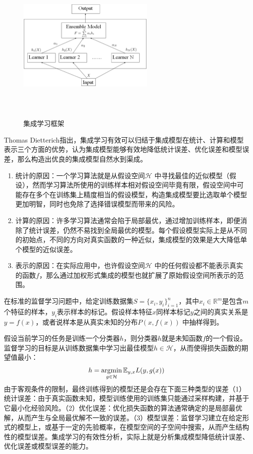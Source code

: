 \begin{figure}[htbp]
  \centering
  \includegraphics[width=0.6\textwidth,height=7cm]{figures/ensemblelearning.eps}\\
  \caption{集成学习框架}\label{fig:ensemblelearning}
\end{figure}

Thomas Dietterich\cite{dietterich2000ensemble}指出，集成学习有效可以归结于集成模型在统计、计算和模型表示三个方面的优势，认为集成模型能够有效地降低统计误差、优化误差和模型误差，那么构造出优良的集成模型自然水到渠成。

\begin{enumerate}[（1）]
  \item 统计的原因：一个学习算法就是从假设空间$\mathcal{H}$ 中寻找最佳的近似模型（假设），然而学习算法所使用的训练样本相对假设空间毕竟有限，假设空间中可能存在多个在训练集上精度相当的假设模型，构造集成模型要比选取单个模型更加明智，同时也免除了选择错误模型而带来的风险。
  \item 计算的原因：许多学习算法通常会陷于局部最优，通过增加训练样本，即便消除了统计误差，仍然不易找到全局最优的模型。每个假设模型实际上是从不同的初始点，不同的方向对真实函数的一种近似，集成模型的效果是大大降低单个模型的近似误差。
  \item 表示的原因：在实际应用中，也许假设空间$\mathcal{H}$ 中的任何假设都不能表示真实的函数$f$，那么通过加权形式集成的模型也就扩展了原始假设空间所表示的范围。
\end{enumerate}

在标准的监督学习问题中，给定训练数据集$S = \{x_i,y_i\}_{i=1}^n$，其中$x_i\in \mathbb{R}^m$是包含$m$个特征的样本，$y_i$表示样本的标记。假设样本特征$x$同样本标记$y$之间的真实关系是$y = f(x)$，或者说样本是从真实未知的分布$P(x,f(x))$ 中抽样得到。

假设当前学习的任务是训练一个分类器$h$，则分类器$h$就是未知函数$f$的一个假设。监督学习的目标是从训练数据集中学习出最佳模型$h\in \mathcal H$，从而使得损失函数的期望值最小：
\[
    h = \operatorname*{\mathrm{\arg\!\min}}\limits_{g\in \mathcal H} \mathbb E_{y,x} L(y,g(x))
\]
由于客观条件的限制，最终训练得到的模型还是会存在下面三种类型的误差（1）统计误差：由于真实函数未知，模型训练使用的训练集只能通过采样构建，并基于它最小化经验风险。（2）优化误差：优化损失函数的算法通常确定的是局部最优解，从而产生与全局最优解不一致的误差。（3）模型误差：监督学习建立在给定形式的模型上，或基于一定的先验概率，在模型空间的子空间中搜索，从而产生结构性的模型误差。集成学习的有效性分析，实际上就是分析集成模型降低统计误差、优化误差或模型误差的能力。


